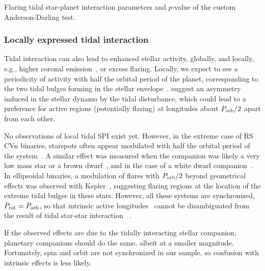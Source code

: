 \documentclass[twocolumn]{aastex631}
\begin{document}
\begin{table*}
\footnotesize
\movetableright=-20mm
\caption{Flaring tidal star-planet interaction parameters and $p$-value of the custom Anderson-Darling test. }

    \label{tab:tidal}
 \tablerefs{}
\end{table*}

\subsubsection{Locally expressed tidal interaction}
Tidal interaction can also lead to enhanced stellar activity, globally, and locally, e.g., higher coronal emission~\citep{ilic2022tidal}, or excess flaring. Locally, we expect to see a periodicity of activity with half the orbital period of the planet, corresponding to the two tidal bulges forming in the stellar envelope~\citep{cuntz2000stellar}. \citet{holzwarth2003dynamics} suggest an asymmetry induced in the stellar dynamo by the tidal disturbance, which could lead to a preference for active regions (potentially flaring) at longitudes about $P_{\rm orb}/2$ apart from each other. 

No observations of local tidal SPI exist yet. However, in the extreme case of RS CVn binaries, starspots often appear modulated with half the orbital period of the system~\citep{olah2002time, ozavci2018recurrent, kriskovics2023ei}. A similar effect was measured when the companion was likely a very low mass star or a brown dwarf~\citep{donati1995activity, frasca2008spots, parks2021interferometric}, and in the case of a white dwarf companion~\citep{hussain2006spot, watson2007roche}. In ellipsoidal binaries, a modulation of flares with $P_{\rm orb}/2$ beyond geometrical effects was observed with Kepler~\citep{gao2016whitelight}, suggesting flaring regions at the location of the extreme tidal bulges in these stars. However, all these systems are synchronized, $P_{\rm rot}=P_{\rm orb}$, so that intrinsic active longitudes~\citep{usoskin2007longterm, weber2013theory, jarvinen2005spots, lanza2009corot} cannot be disambiguated from the result of tidal star-star interaction ~\citep{holzwarth2003dynamics}. 

If the observed effects are due to the tidally interacting stellar companion, planetary companions should do the same, albeit at a smaller magnitude. Fortunately, spin and orbit are not synchronized in our sample, so confusion with intrinsic effects is less likely. 
\end{document}

